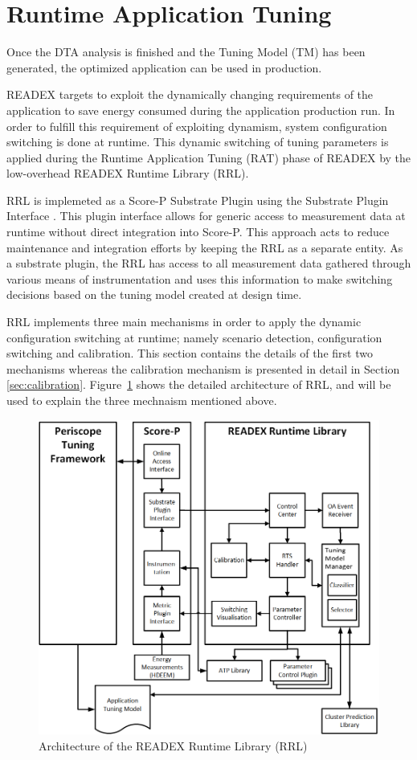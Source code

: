 \section{Runtime Application Tuning} \label{rat}

Once the DTA analysis is finished and the Tuning Model (TM) has been generated, the optimized application can be used in production. 

READEX targets to exploit the dynamically changing requirements of the application to save energy consumed during the application production run. In order to fulfill this requirement of exploiting dynamism, system configuration switching is done at runtime. This dynamic switching of tuning parameters is applied during the Runtime Application Tuning (RAT) phase of READEX by the low-overhead READEX Runtime Library (RRL). 

RRL is implemeted as a Score-P Substrate Plugin using the Substrate Plugin Interface \cite{Schoene2017}. This plugin interface allows for generic access to measurement data at runtime without direct integration into Score-P. This approach acts to reduce maintenance and integration efforts by keeping the RRL as a separate entity. As a substrate plugin, the RRL has
access to all measurement data gathered through various means of instrumentation and uses this information to make switching decisions based on the tuning model created at design time.

RRL implements three main mechanisms in order to apply the dynamic configuration switching at runtime; namely scenario detection, configuration switching and calibration. This section contains the details of the first two mechanisms whereas the calibration mechanism is presented in detail in Section \ref{sec:calibration}.
Figure~\ref{fig:rrl} shows the detailed architecture of RRL, and will be used to explain the three mechnaism mentioned above.

\begin{figure}[!t]
\centering
\includegraphics[width=.8\columnwidth]{figures/RRL_Architecture.png}
\caption{Architecture of the READEX Runtime Library (RRL)}
\label{fig:rrl}
\end{figure}

